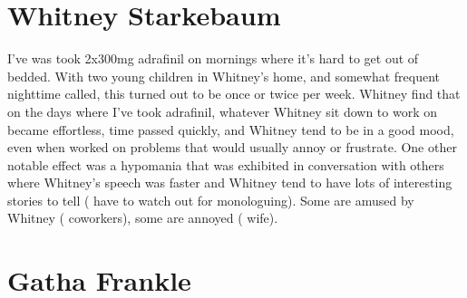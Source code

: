 \documentclass[12pt]{book}
\begin{document}
\chapter{Whitney Starkebaum}

I've was took 2x300mg adrafinil on mornings where it's hard to get out of bedded. With two young children in Whitney's home, and somewhat frequent nighttime called, this turned out to be once or twice per week. Whitney find that on the days where I've took adrafinil, whatever Whitney sit down to work on became effortless, time passed quickly, and Whitney tend to be in a good mood, even when worked on problems that would usually annoy or frustrate. One other notable effect was a hypomania that was exhibited in conversation with others where Whitney's speech was faster and Whitney tend to have lots of interesting stories to tell ( have to watch out for monologuing). Some are amused by Whitney ( coworkers), some are annoyed ( wife).






\chapter{Gatha Frankle}
\end{document}
